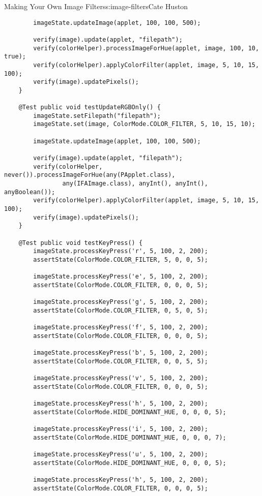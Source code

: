 \begin{aosachapter}{Making Your Own Image Filters}{s:image-filters}{Cate Huston}
\begin{verbatim}
        imageState.updateImage(applet, 100, 100, 500);

        verify(image).update(applet, "filepath");
        verify(colorHelper).processImageForHue(applet, image, 100, 10, true);
        verify(colorHelper).applyColorFilter(applet, image, 5, 10, 15, 100);
        verify(image).updatePixels();
    }

    @Test public void testUpdateRGBOnly() {
        imageState.setFilepath("filepath");
        imageState.set(image, ColorMode.COLOR_FILTER, 5, 10, 15, 10);

        imageState.updateImage(applet, 100, 100, 500);

        verify(image).update(applet, "filepath");
        verify(colorHelper, never()).processImageForHue(any(PApplet.class), 
                any(IFAImage.class), anyInt(), anyInt(), anyBoolean());
        verify(colorHelper).applyColorFilter(applet, image, 5, 10, 15, 100);
        verify(image).updatePixels();
    }

    @Test public void testKeyPress() {
        imageState.processKeyPress('r', 5, 100, 2, 200);
        assertState(ColorMode.COLOR_FILTER, 5, 0, 0, 5);

        imageState.processKeyPress('e', 5, 100, 2, 200);
        assertState(ColorMode.COLOR_FILTER, 0, 0, 0, 5);

        imageState.processKeyPress('g', 5, 100, 2, 200);
        assertState(ColorMode.COLOR_FILTER, 0, 5, 0, 5);

        imageState.processKeyPress('f', 5, 100, 2, 200);
        assertState(ColorMode.COLOR_FILTER, 0, 0, 0, 5);

        imageState.processKeyPress('b', 5, 100, 2, 200);
        assertState(ColorMode.COLOR_FILTER, 0, 0, 5, 5);

        imageState.processKeyPress('v', 5, 100, 2, 200);
        assertState(ColorMode.COLOR_FILTER, 0, 0, 0, 5);

        imageState.processKeyPress('h', 5, 100, 2, 200);
        assertState(ColorMode.HIDE_DOMINANT_HUE, 0, 0, 0, 5);

        imageState.processKeyPress('i', 5, 100, 2, 200);
        assertState(ColorMode.HIDE_DOMINANT_HUE, 0, 0, 0, 7);

        imageState.processKeyPress('u', 5, 100, 2, 200);
        assertState(ColorMode.HIDE_DOMINANT_HUE, 0, 0, 0, 5);

        imageState.processKeyPress('h', 5, 100, 2, 200);
        assertState(ColorMode.COLOR_FILTER, 0, 0, 0, 5);


\end{verbatim}
\end{aosachapter}
